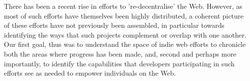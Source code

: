 \documentclass{amsart}
\begin{document}





There has been a recent rise in efforts to 're-decentralise' the Web. However, as most of such efforts have themselves been highly distributed, a coherent picture of these efforts have not previously been assembled, in particular towards identifying the ways that such projects complement or overlap with one another. Our first goal, thus was to understand the space of indie web efforts to chronicle both the areas where progress has been made, and, second and perhaps more importantly, to identify the capabilities that developers participating in such efforts see as needed to empower individuals on the Web. 
\end{document}

